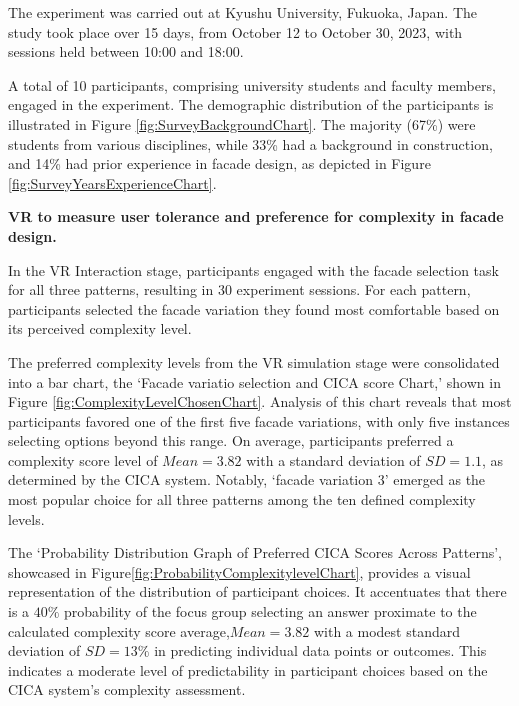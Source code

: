 
The experiment was carried out at Kyushu University, Fukuoka, Japan.
The study took place over 15 days, from October 12 to October 30, 2023, with sessions held between 10:00 and 18:00.

A total of 10 participants, comprising university students and faculty members, engaged in the experiment.
The demographic distribution of the participants is illustrated in Figure \ref{fig:SurveyBackgroundChart}.
The majority (67\%) were students from various disciplines, while 33\% had a background in construction, and 14\% had prior experience in facade design, as depicted in Figure \ref{fig:SurveyYearsExperienceChart}.

\textbf{VR to measure user tolerance and preference for complexity in facade design.}

In the VR Interaction stage, participants engaged with the facade selection task for all three patterns, resulting in 30 experiment sessions.
For each pattern, participants selected the facade variation they found most comfortable based on its perceived complexity level.


The preferred complexity levels from the VR simulation stage were consolidated into a bar chart, the `Facade variatio selection and CICA score Chart,' shown in Figure \ref{fig:ComplexityLevelChosenChart}.
Analysis of this chart reveals that most participants favored one of the first five facade variations, with only five instances selecting options beyond this range.
On average, participants preferred a complexity score level of \(Mean = 3.82\) with a standard deviation of \(SD = 1.1\), as determined by the CICA system.
Notably, `facade variation 3' emerged as the most popular choice for all three patterns among the ten defined complexity levels.


The `Probability Distribution Graph of Preferred CICA Scores Across Patterns', showcased in Figure\ref{fig:ProbabilityComplexitylevelChart}, provides a visual representation of the distribution of participant choices.
It accentuates that there is a \(40\%\) probability of the focus group selecting an answer proximate to the calculated complexity score average,\(Mean = 3.82\) with a modest standard deviation of \(SD = 13\%\) in predicting individual data points or outcomes.
 This indicates a moderate level of predictability in participant choices based on the CICA system's complexity assessment.

